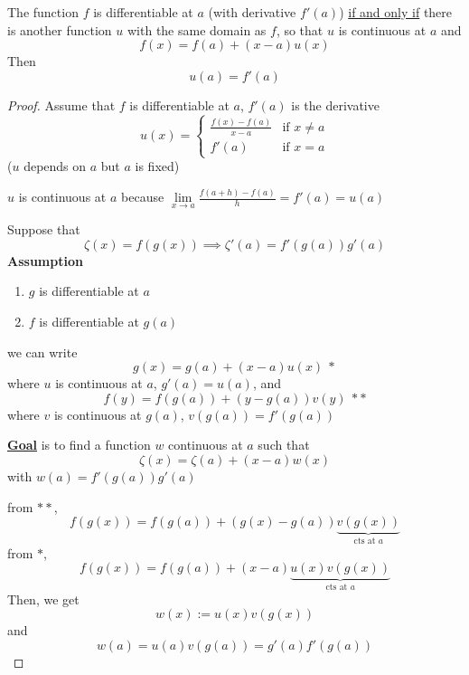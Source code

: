 \begin{theorem*}
  The function $f$ is differentiable at $a$ (with derivative $f'(a)$) \underline{if and only if} 
  there is another function $u$ with the same domain as $f$, 
  so that $u$ is continuous at $a$ and $$f(x) = f(a) + (x-a)u(x)$$
  Then $$u(a) = f'(a)$$

\end{theorem*}

\begin{proof}
    Assume that $f$ is differentiable at $a$, $f'(a)$ is the derivative
  \[
    u(x) = \begin{cases}
      \frac{f(x) - f(a)}{x-a} & \text{if } x \neq a \\
      f'(a) & \text{if } x = a
    \end{cases} 
  \]
  ($u$ depends on $a$ but $a$ is fixed)

  $u$ is continuous at $a$ because $\lim\limits_{x \to a} \frac{f(a+h) - f(a)}{h} = f'(a) = u(a)$
  
  







  Suppose that $$\zeta(x) = f(g(x)) \implies \zeta'(a) = f'(g(a))g'(a)$$
  \textbf{Assumption}
  \begin{enumerate}[(1)]
    \item $g$ is differentiable at $a$
    \item $f$ is differentiable at $g(a)$
  \end{enumerate}
  we can write 
  $$g(x) = g(a) + (x-a)u(x)\ \ast$$
  where $u$ is continuous at $a$, $g'(a) = u(a)$, and
  $$f(y) = f(g(a)) + (y - g(a))v(y)\ \ast \ast $$
  where $v$ is continuous at $g(a)$, $v(g(a)) = f'(g(a))$

  \underline{\textbf{Goal}} is to find a function $w$ continuous at $a$ such that 
  $$\zeta(x) = \zeta(a) + (x - a)w(x)$$
  with $w(a) = f'(g(a))g'(a)$

  from $\ast \ast $, $$f(g(x)) = f(g(a)) + (g(x) - g(a))\underbrace{v(g(x))}_{\text{cts at }a}$$
  from $\ast $, $$f(g(x)) = f(g(a)) + (x-a)\underbrace{u(x)v(g(x))}_{\text{cts at }a}$$
  Then, we get 
  $$w(x):= u(x)v(g(x))$$
  and
  $$w(a) = u(a)v(g(a)) = g'(a)f'(g(a))$$
\end{proof}

